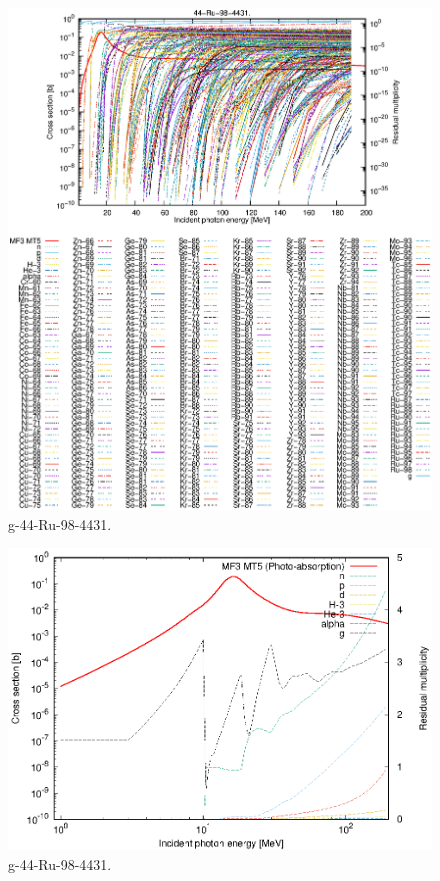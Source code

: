 \begin{figure}
 \includegraphics[width=\linewidth]{eps/g_44-Ru-98_4431.eps}
  \caption{g-44-Ru-98-4431.}
\end{figure}
\newpage \clearpage

\begin{figure}
 \includegraphics[width=\linewidth]{eps-log/g_44-Ru-98_4431.eps}
 \caption{g-44-Ru-98-4431.}
\end{figure}
\newpage \clearpage

